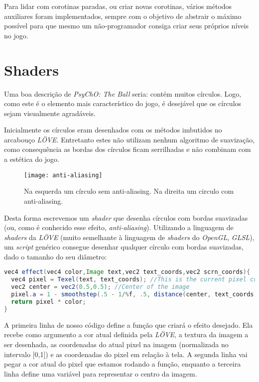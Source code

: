 Para lidar com corotinas paradas, ou criar novas corotinas, vários métodos auxiliares foram implementados, sempre com o objetivo de abstrair o máximo possível para que mesmo um não-programador consiga criar seus próprios níveis no jogo.

\section{Shaders}
\label{sec:shaders}

Uma boa descrição de \textit{PsyChO: The Ball} seria: contém muitos círculos. Logo, como este é o elemento mais característico do jogo, é desejável que os círculos sejam visualmente agradáveis.

Inicialmente os círculos eram desenhados com os métodos imbutidos no arcabouço \textit{LÖVE}. Entretanto estes não utilizam nenhum algoritmo de suavização, como consequência as bordas dos círculos ficam serrilhadas e não combinam com a estética do jogo.

\begin{figure}[h!]
\texttt{[image: anti-aliasing]}
\centering
\caption{Na esquerda um círculo sem anti-aliasing. Na direita um circulo com anti-aliasing.}
\end{figure}

Desta forma escrevemos um \textit{shader} que desenha círculos com bordas suavizadas (ou, como é conhecido esse efeito, \textit{anti-aliasing}). Utilizando a linguagem de \textit{shaders} da \textit{LÖVE} (muito semelhante à linguagem de \textit{shaders} do \textit{OpenGL}, \textit{GLSL}), um \textit{script} genérico consegue desenhar qualquer círculo com bordas suavizadas, dado o tamanho do seu diâmetro:

\begin{lstlisting}[language=java]
vec4 effect(vec4 color,Image text,vec2 text_coords,vec2 scrn_coords){
  vec4 pixel = Texel(text, text_coords); //This is the current pixel color
  vec2 center = vec2(0.5,0.5); //Center of the image
  pixel.a = 1 - smoothstep(.5 - 1/%f, .5, distance(center, text_coords));
  return pixel * color;
}
\end{lstlisting}

A primeira linha de nosso código define a função que criará o efeito desejado. Ela recebe como argumento a cor atual definida pela \textit{LÖVE}, a textura da imagem a ser desenhada, as coordenadas do atual pixel na imagem (normalizada no intervalo [0,1]) e as coordenadas do pixel em relação à tela. A segunda linha vai pegar a cor atual do pixel que estamos rodando a função,
enquanto a terceira linha define uma variável para representar o centro da imagem.

